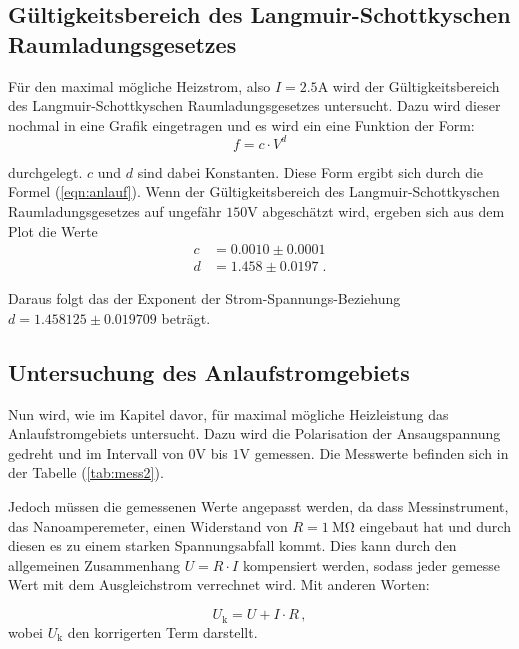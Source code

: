 \subsection{Gültigkeitsbereich des Langmuir-Schottkyschen Raumladungsgesetzes}

Für den maximal mögliche Heizstrom, also $I = 2.5 \si{\ampere}$ wird der Gültigkeitsbereich des Langmuir-Schottkyschen Raumladungsgesetzes untersucht. Dazu wird dieser nochmal in eine 
Grafik eingetragen und es wird ein eine Funktion der Form:
\begin{equation*}
    f = c \cdot V^d    
\end{equation*}

durchgelegt. $c$ und $d$ sind dabei Konstanten. Diese Form ergibt sich durch die Formel (\ref{eqn:anlauf}). Wenn der Gültigkeitsbereich des Langmuir-Schottkyschen Raumladungsgesetzes
auf ungefähr $150 \si{\volt} $ abgeschätzt wird, ergeben sich aus dem Plot die Werte
\begin{align*}
    c &= 0.0010 \pm 0.0001 \\
    d &= 1.458 \pm 0.0197 \; .
\end{align*}

Daraus folgt das der Exponent der Strom-Spannungs-Beziehung $d = 1.458125 \pm 0.019709$ beträgt.

\subsection{Untersuchung des Anlaufstromgebiets}
Nun wird, wie im Kapitel davor, für maximal mögliche Heizleistung das Anlaufstromgebiets untersucht. Dazu wird die Polarisation der Ansaugspannung gedreht und im Intervall von
$0 \si{\volt} $ bis $1 \si{\volt} $ gemessen. Die Messwerte befinden sich in der Tabelle (\ref{tab:mess2}).

Jedoch müssen die gemessenen Werte angepasst werden, da dass Messinstrument, das Nanoamperemeter, einen Widerstand von $R = \SI{1}{\mega\ohm}$
eingebaut hat und durch diesen es zu einem starken Spannungsabfall kommt. Dies kann durch den allgemeinen Zusammenhang $ U = R \cdot I$ kompensiert werden, sodass jeder gemesse Wert 
mit dem Ausgleichstrom verrechnet wird. Mit anderen Worten:

\begin{equation*}
    U_\text{k} = U + I \cdot R \, ,  
\end{equation*}
wobei $U_\text{k}$ den korrigerten Term darstellt. 

